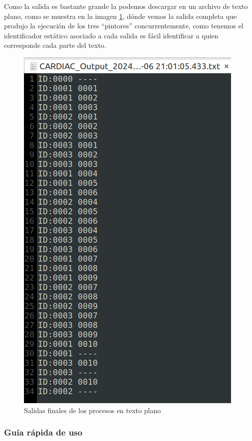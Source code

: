 \documentclass[letterpaper,12pt,oneside]{book}
\begin{document}
		Como la salida es bastante grande la podemos descargar en un archivo de texto plano, como se muestra en la imagen \ref{fig:Salida3Procesos}, dónde
		vemos la salida completa que produjo la ejecución de los tres ``pintores'' concurrentemente, como tenemos el identificador estático asociado
		a cada salida es fácil identificar a quien corresponde cada parte del texto.
		
		
		\begin{figure}[h]		
			\centering
			\includegraphics[scale=0.5]{media/CARDIACC/Salida3Procesos.png}
			\caption{ Salidas finales de los procesos en texto plano}
			\label{fig:Salida3Procesos}
		\end{figure}

		\clearpage
		
		\subsubsection{Guía rápida de uso}
		
\end{document}
